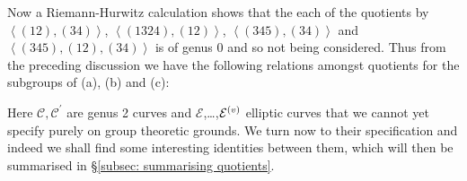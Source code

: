 \documentclass{amsart}
\newcommand{\pangle}[1]{\left\langle #1 \right\rangle}
\begin{document}
Now a Riemann-Hurwitz calculation shows that the each of the quotients
by $\pangle{(12),(34)}$,  $\pangle{(1324),(12)}$, $\pangle{(345), (34)}$ and $\pangle{(345),(12),(34)}$ is of genus $0$ and so not being considered. Thus from the preceding discussion we have the following relations amongst quotients for the subgroups of (a), (b) and (c):
\begin{center}

\qquad
\qquad
{}
\end{center}
Here  $\mathcal{C}, \mathcal{C}^\prime$ are genus 2 curves and $\mathcal{E}$,\ldots,$\mathcal{E}\sp{(v)}$ elliptic curves that we cannot yet specify purely on group theoretic grounds. We turn now to their specification and indeed we shall find some interesting identities between them, which will then be summarised in \S\ref{subsec: summarising quotients}.
\end{document}
